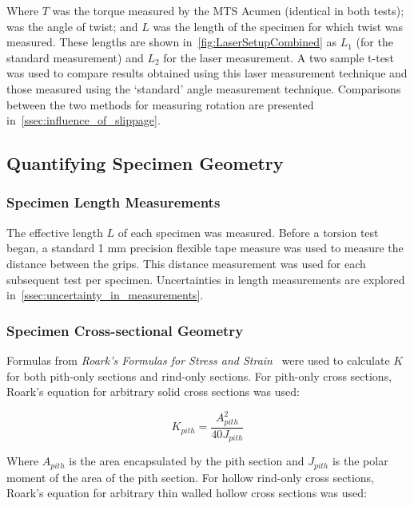 Where ${T}$ was the torque measured by the MTS Acumen (identical in both tests);  was the angle of twist; and ${L}$ was the length of the specimen for which twist was measured. These lengths are shown in~\cref{fig:LaserSetupCombined} as ${L_{1}}$ (for the standard measurement) and ${L_{2}}$ for the laser measurement. A two sample t-test was used to compare results obtained using this laser measurement technique and those measured using the ‘standard’ angle measurement technique. Comparisons between the two methods for measuring rotation are presented in~\cref{ssec:influence_of_slippage}.

\subsection{Quantifying Specimen Geometry}
\label{ssec:quantifying_specimen_geometry}

\subsubsection{Specimen Length Measurements}
\label{ssec:specimen_length_measurements}
The effective length ${L}$ of each specimen was measured. Before a torsion test began, a standard 1 mm precision flexible tape measure was used to measure the distance between the grips. This distance measurement was used for each subsequent test per specimen. Uncertainties in length measurements are explored in~\cref{ssec:uncertainty_in_measurements}.

\subsubsection{Specimen Cross-sectional Geometry}
\label{ssec:specimen_cross_sectional_geometry}
Formulas from \textit{Roark's Formulas for Stress and Strain}~ were used to calculate ${K}$ for both pith-only sections and rind-only sections. For pith-only cross sections, Roark’s equation for arbitrary solid cross sections was used:

\begin{equation}
	\label{eq:kpith}
	K_{pith} = \frac{A_{pith}^{2}}{40J_{pith}}
\end{equation}

Where ${A_{pith}}$ is the area encapsulated by the pith section and ${J_{pith}}$ is the polar moment of the area of the pith section. For hollow rind-only cross sections, Roark’s equation for arbitrary thin walled hollow cross sections was used:

